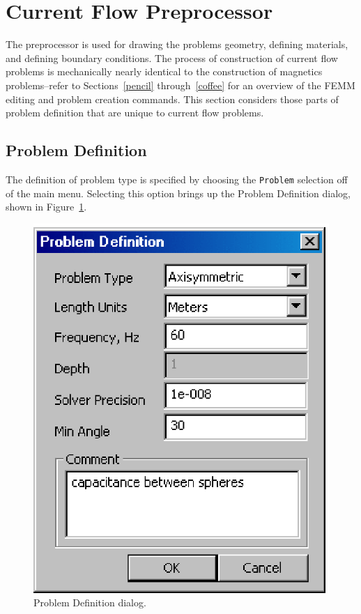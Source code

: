 \section{Current Flow Preprocessor}

The preprocessor is used for drawing the problems geometry, defining
materials, and defining boundary conditions. The process of construction of current
flow problems is mechanically nearly identical to the construction of
magnetics problems--refer to Sections~\ref{pencil} through~\ref{coffee} for
an overview of the FEMM editing and problem creation commands. This section
considers those parts of problem definition that are unique to current flow problems.

\subsection{Problem Definition}

The definition of problem type is specified by choosing the
\texttt{Problem} selection off of the main menu. Selecting this
option brings up the Problem Definition dialog, shown in
Figure~\ref{cfig5}.

\begin{figure}[htbp]
\centerline{\includegraphics{cd1.ps}}
\caption{Problem Definition dialog.}
\label{cfig5}
\end{figure}

